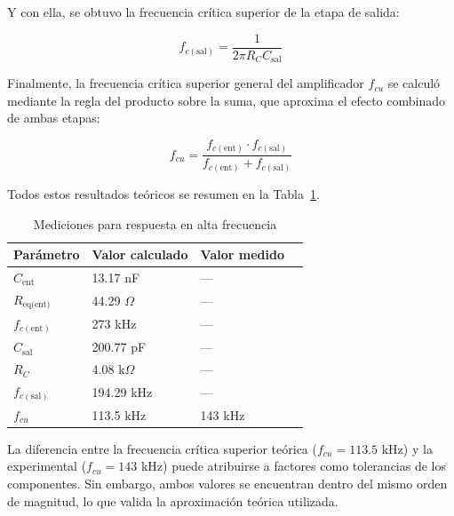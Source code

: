 \documentclass[journal]{IEEEtran}
\begin{document}
Y con ella, se obtuvo la frecuencia crítica superior de la etapa de salida:

\begin{equation}
f_{c(\text{sal})} = \frac{1}{2\pi R_C C_{\text{sal}}}
\end{equation}

Finalmente, la frecuencia crítica superior general del amplificador $f_{cu}$ se calculó mediante la regla del producto sobre la suma, que aproxima el efecto combinado de ambas etapas:

\begin{equation}
f_{cu} = \frac{f_{c(\text{ent})} \cdot f_{c(\text{sal})}}{f_{c(\text{ent})} + f_{c(\text{sal})}}
\end{equation}

Todos estos resultados teóricos se resumen en la Tabla~\ref{tab:parámetrosdc}.
\begin{table}[H]
\centering
\caption{Mediciones para respuesta en alta frecuencia}
\label{tab:parámetrosdc}
\begin{tabular}{|l|p{2cm}|p{2cm}|p{2cm}|}
\hline
\textbf{Parámetro} & \textbf{Valor calculado} & \textbf{Valor medido} \\
\hline
$C_{\text{ent}}$     & 13.17 nF       & ---         \\
\hline
$R_{\text{eq(ent)}}$ & 44.29 $\Omega$ & ---         \\
\hline
$f_{c(\text{ent})}$  & 273 kHz        & ---         \\
\hline
$C_{\text{sal}}$     & 200.77 pF      & ---         \\
\hline
$R_C$                & 4.08 k$\Omega$ & ---         \\
\hline
$f_{c(\text{sal})}$  & 194.29 kHz     & ---         \\
\hline
$f_{cu}$             & 113.5 kHz      & 143 kHz     \\
\hline
\end{tabular}
\end{table}

\par La diferencia entre la frecuencia crítica superior teórica ($f_{cu} = 113.5$ kHz) y la experimental ($f_{cu} = 143$ kHz) puede atribuirse a factores como tolerancias de los componentes. Sin embargo, ambos valores se encuentran dentro del mismo orden de magnitud, lo que valida la aproximación teórica utilizada.
\end{document}
